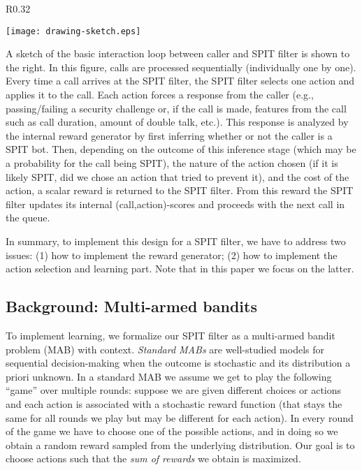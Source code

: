 \documentclass{llncs}
\begin{document}
\begin{wrapfigure}{R}{0.32\textwidth}
\vspace{-20pt}
\begin{center}
\texttt{[image: drawing-sketch.eps]}
\end{center}
\vspace{-20pt}
\end{wrapfigure}
A sketch of the basic interaction loop between caller and SPIT filter is shown to the right. In this figure,
calls are processed sequentially (individually one by one). Every time a call arrives at the SPIT filter, 
the SPIT filter selects one action and applies it to the call. Each action forces a response from the caller
(e.g., passing/failing a security challenge or, if the call is made, features from the call such as call
duration, amount of double talk, etc.). This response is analyzed by the internal reward generator by first
inferring whether or not the caller is a SPIT bot. Then, depending on the outcome of this inference stage
(which may be a probability for the call being SPIT), the nature of the action chosen (if it is likely SPIT,
did we chose an action that tried to prevent it), and the cost of the action, a scalar reward is returned to
the SPIT filter. From this reward the SPIT filter updates its internal (call,action)-scores and proceeds
with the next call in the queue. 

In summary, to implement this design for a SPIT filter, we have to address two issues: (1) how to implement
the reward generator; (2) how to implement the action selection and learning part. Note that in this paper
we focus on the latter. 


\subsection{Background: Multi-armed bandits}
\label{seq:MAB}
To implement learning, we formalize our SPIT filter as a 
multi-armed bandit problem (MAB) with context. {\em Standard MABs} are well-studied
models for sequential decision-making when the outcome is stochastic and its distribution
a priori unknown. In a standard MAB we assume we get to play the following ``game'' over
multiple rounds: suppose we are given  different choices or actions and each action
is associated with a stochastic reward function (that stays the same for all rounds we play
but may be different for each action). In every round of the game we have to choose one
of the  possible actions, and in doing so we obtain a random reward sampled from 
the underlying distribution. Our goal is to choose actions such that the 
{\em sum of rewards} we obtain is maximized.
\end{document}
